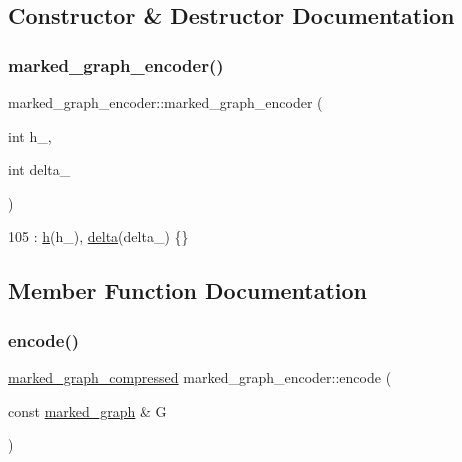 \subsection{Constructor \& Destructor Documentation}
\mbox{\label{classmarked__graph__encoder_a128d2a38b23ce620c77d00a5eff487ea}} 
\subsubsection{\texorpdfstring{marked\+\_\+graph\+\_\+encoder()}{marked\_graph\_encoder()}}
{\footnotesize\ttfamily marked\+\_\+graph\+\_\+encoder\+::marked\+\_\+graph\+\_\+encoder (\begin{DoxyParamCaption}\item[{int}]{h\+\_\+,  }\item[{int}]{delta\+\_\+ }\end{DoxyParamCaption})\hspace{0.3cm}{\ttfamily [inline]}}


\begin{DoxyCode}
105 : \hyperlink{classmarked__graph__encoder_ae7f8872c57d2d64e4ca6cc47387b9b58}{h}(h\_), \hyperlink{classmarked__graph__encoder_a29dcf42526b12cf7964a556bb1025c9b}{delta}(delta\_) \{\}
\end{DoxyCode}


\subsection{Member Function Documentation}
\mbox{\label{classmarked__graph__encoder_aa7fa19a225dd9b31d6fef9583fab8cf1}} 
\subsubsection{\texorpdfstring{encode()}{encode()}\hspace{0.1cm}{\footnotesize\ttfamily [1/2]}}
{\footnotesize\ttfamily \hyperlink{classmarked__graph__compressed}{marked\+\_\+graph\+\_\+compressed} marked\+\_\+graph\+\_\+encoder\+::encode (\begin{DoxyParamCaption}\item[{const \hyperlink{classmarked__graph}{marked\+\_\+graph} \&}]{G }\end{DoxyParamCaption})}



